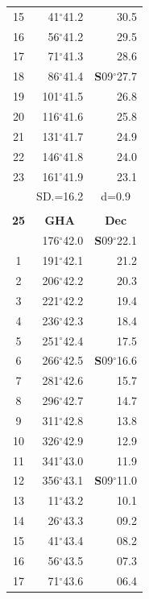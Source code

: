 \documentclass[10pt, a4paper]{report}
\begin{document}
\begin{scriptsize}
\begin{tabular*}{0.2\textwidth}[t]{@{\extracolsep{\fill}}|c|rr|}
15 & 41$^\circ$41.2 & \raisebox{0.24ex}{\boldmath$\cdot$~\boldmath$\cdot$~~}30.5\\
16 & 56$^\circ$41.2 & 29.5\\
17 & 71$^\circ$41.3 & 28.6\\[2Pt]
18 & 86$^\circ$41.4 & \textbf{S}09$^\circ$27.7\\
19 & 101$^\circ$41.5 & 26.8\\
20 & 116$^\circ$41.6 & 25.8\\
21 & 131$^\circ$41.7 & \raisebox{0.24ex}{\boldmath$\cdot$~\boldmath$\cdot$~~}24.9\\
22 & 146$^\circ$41.8 & 24.0\\
23 & 161$^\circ$41.9 & 23.1\\
\hline
\rule{0pt}{2.4ex} & \multicolumn{1}{c}{SD.=16.2} & \multicolumn{1}{c|}{d=0.9}\\
\hline
\multicolumn{1}{c}{}\\[-0.5ex]\hline
\multicolumn{1}{|c|}{\rule{0pt}{2.6ex}\textbf{25}} & \multicolumn{1}{c}{\textbf{GHA}} & \multicolumn{1}{c|}{\textbf{Dec}}\\
\hline\rule{0pt}{2.6ex}\noindent
0 & 176$^\circ$42.0 & \textbf{S}09$^\circ$22.1\\
1 & 191$^\circ$42.1 & 21.2\\
2 & 206$^\circ$42.2 & 20.3\\
3 & 221$^\circ$42.2 & \raisebox{0.24ex}{\boldmath$\cdot$~\boldmath$\cdot$~~}19.4\\
4 & 236$^\circ$42.3 & 18.4\\
5 & 251$^\circ$42.4 & 17.5\\[2Pt]
6 & 266$^\circ$42.5 & \textbf{S}09$^\circ$16.6\\
7 & 281$^\circ$42.6 & 15.7\\
8 & 296$^\circ$42.7 & 14.7\\
9 & 311$^\circ$42.8 & \raisebox{0.24ex}{\boldmath$\cdot$~\boldmath$\cdot$~~}13.8\\
10 & 326$^\circ$42.9 & 12.9\\
11 & 341$^\circ$43.0 & 11.9\\[2Pt]
12 & 356$^\circ$43.1 & \textbf{S}09$^\circ$11.0\\
13 & 11$^\circ$43.2 & 10.1\\
14 & 26$^\circ$43.3 & 09.2\\
15 & 41$^\circ$43.4 & \raisebox{0.24ex}{\boldmath$\cdot$~\boldmath$\cdot$~~}08.2\\
16 & 56$^\circ$43.5 & 07.3\\
17 & 71$^\circ$43.6 & 06.4\\[2Pt]

\end{tabular*}
\end{scriptsize}
\end{document}
